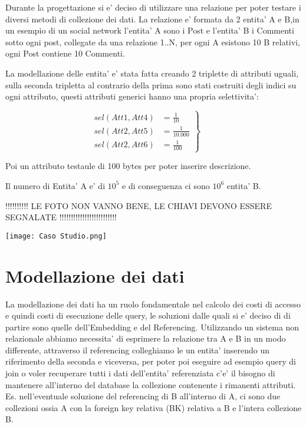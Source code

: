 Durante la progettazione si e' deciso di utilizzare una relazione per poter testare i diversi metodi di collezione dei dati.
La relazione e' formata da 2 entita' A e B,in un esempio di un social network l'entita' A sono i Post e l'entita' B i Commenti sotto ogni post, collegate da una relazione 1..N,
per ogni A esistono 10 B relativi, ogni Post contiene 10 Commenti.

La modellazione delle entita' e' stata fatta creando 2 triplette di attributi uguali, sulla seconda tripletta al contrario della prima sono stati costruiti degli indici su ogni attributo,
questi attributi generici hanno una propria selettivita':

    \begin{equation*}
        \left.\begin{aligned}
         sel(Att1, Att4) &= \frac{1}{10}    \\
         sel(Att2, Att5) &= \frac{1}{10.000} \\
         sel(Att2, Att6) &= \frac{1}{100}
        \end{aligned}
        \right\}
        \qquad 
        \end{equation*}

Poi un attributo testaule di 100 bytes per poter inserire descrizione.

Il numero di Entita' A e' di $10^5$ e di conseguenza ci sono $10^6$ entita' B.

!!!!!!!!!! LE FOTO NON VANNO BENE, LE CHIAVI DEVONO ESSERE SEGNALATE !!!!!!!!!!!!!!!!!!!!!!!!!
\begin{center}
    \texttt{[image: Caso Studio.png]}
\end{center}


\section{Modellazione dei dati}

La modellazione dei dati ha un ruolo fondamentale nel calcolo dei costi di accesso e quindi costi di esecuzione delle query, le soluzioni dalle quali si e' deciso di di partire 
sono quelle dell'Embedding e del Referencing. Utilizzando un sistema non relazionale abbiamo necessita' di esprimere la relazione tra A e B in un modo differente, attraverso il 
referencing colleghiamo le un entita' inserendo un riferimento della seconda e viceversa, per poter poi eseguire ad esempio query di join o voler recuperare tutti i dati 
dell'entita' referenziata c'e' il bisogno di mantenere all'interno del database la collezione contenente i rimanenti attributi. Es. nell'eventuale soluzione del referencing di B all'interno 
di A, ci sono due collezioni ossia A con la foreign key relativa (BK) relativa a B e l'intera collezione B. 

